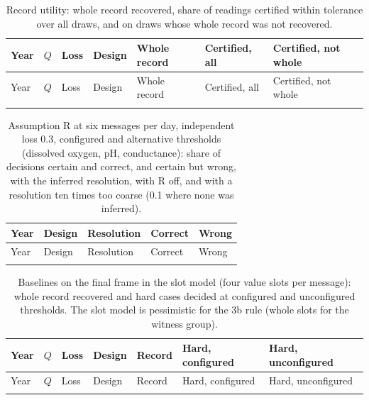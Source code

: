 ﻿\documentclass[12pt]{article}
\begin{document}
{\footnotesize
\begin{longtable}{@{}lllllll@{}}
\caption{Record utility: whole record recovered, share of readings certified within tolerance over all draws, and on draws whose whole record was not recovered.}\\
\toprule
Year & $Q$ & Loss & Design & Whole record & Certified, all & Certified, not whole \\
\midrule
\endfirsthead
\toprule
Year & $Q$ & Loss & Design & Whole record & Certified, all & Certified, not whole \\
\midrule
\endhead
\bottomrule
\endfoot

\end{longtable}
}

{\footnotesize
\begin{longtable}{@{}lllll@{}}
\caption{Assumption R at six messages per day, independent loss 0.3, configured and alternative thresholds (dissolved oxygen, pH, conductance): share of decisions certain and correct, and certain but wrong, with the inferred resolution, with R off, and with a resolution ten times too coarse (0.1 where none was inferred).}\\
\toprule
Year & Design & Resolution & Correct & Wrong \\
\midrule
\endfirsthead
\toprule
Year & Design & Resolution & Correct & Wrong \\
\midrule
\endhead
\bottomrule
\endfoot

\end{longtable}
}

{\footnotesize
\begin{longtable}{@{}lllllll@{}}
\caption{Baselines on the final frame in the slot model (four value slots per message): whole record recovered and hard cases decided at configured and unconfigured thresholds. The slot model is pessimistic for the 3b rule (whole slots for the witness group).}\\
\toprule
Year & $Q$ & Loss & Design & Record & Hard, configured & Hard, unconfigured \\
\midrule
\endfirsthead
\toprule
Year & $Q$ & Loss & Design & Record & Hard, configured & Hard, unconfigured \\
\midrule
\endhead
\bottomrule
\endfoot

\end{longtable}
}
\end{document}
